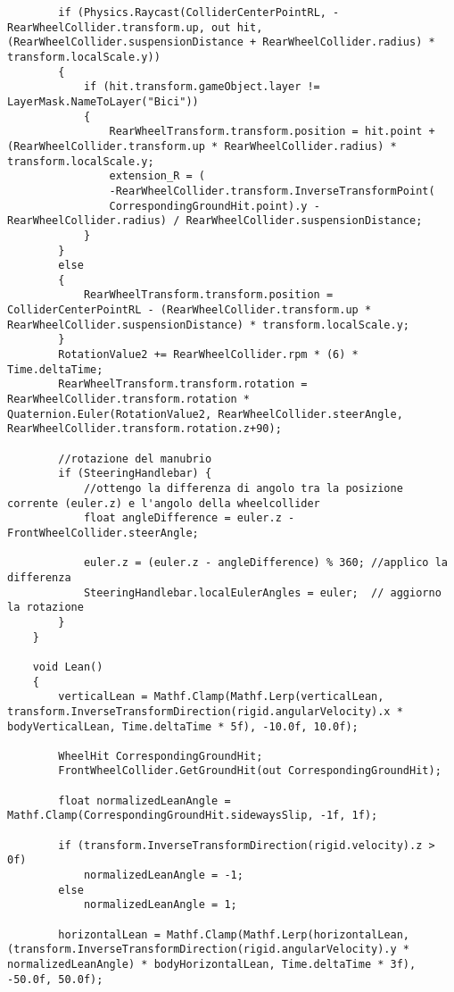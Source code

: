 \begin{lstlisting}
        if (Physics.Raycast(ColliderCenterPointRL, -RearWheelCollider.transform.up, out hit, (RearWheelCollider.suspensionDistance + RearWheelCollider.radius) * transform.localScale.y))
        {
            if (hit.transform.gameObject.layer != LayerMask.NameToLayer("Bici"))
            {
                RearWheelTransform.transform.position = hit.point + (RearWheelCollider.transform.up * RearWheelCollider.radius) * transform.localScale.y;
                extension_R = (
                -RearWheelCollider.transform.InverseTransformPoint(
                CorrespondingGroundHit.point).y - RearWheelCollider.radius) / RearWheelCollider.suspensionDistance;
			}
        } 
        else
        {
            RearWheelTransform.transform.position = ColliderCenterPointRL - (RearWheelCollider.transform.up * RearWheelCollider.suspensionDistance) * transform.localScale.y;
        }
        RotationValue2 += RearWheelCollider.rpm * (6) * Time.deltaTime;
        RearWheelTransform.transform.rotation = RearWheelCollider.transform.rotation * Quaternion.Euler(RotationValue2, RearWheelCollider.steerAngle, RearWheelCollider.transform.rotation.z+90);

        //rotazione del manubrio
		if (SteeringHandlebar) {
            //ottengo la differenza di angolo tra la posizione corrente (euler.z) e l'angolo della wheelcollider
            float angleDifference = euler.z - FrontWheelCollider.steerAngle;
            
            euler.z = (euler.z - angleDifference) % 360; //applico la differenza
            SteeringHandlebar.localEulerAngles = euler;  // aggiorno la rotazione
        }
    }

    void Lean()
    {
        verticalLean = Mathf.Clamp(Mathf.Lerp(verticalLean, transform.InverseTransformDirection(rigid.angularVelocity).x * bodyVerticalLean, Time.deltaTime * 5f), -10.0f, 10.0f);

        WheelHit CorrespondingGroundHit;
        FrontWheelCollider.GetGroundHit(out CorrespondingGroundHit);

        float normalizedLeanAngle = Mathf.Clamp(CorrespondingGroundHit.sidewaysSlip, -1f, 1f);

        if (transform.InverseTransformDirection(rigid.velocity).z > 0f)
            normalizedLeanAngle = -1;
        else
            normalizedLeanAngle = 1;

        horizontalLean = Mathf.Clamp(Mathf.Lerp(horizontalLean, (transform.InverseTransformDirection(rigid.angularVelocity).y * normalizedLeanAngle) * bodyHorizontalLean, Time.deltaTime * 3f), -50.0f, 50.0f);


\end{lstlisting}
